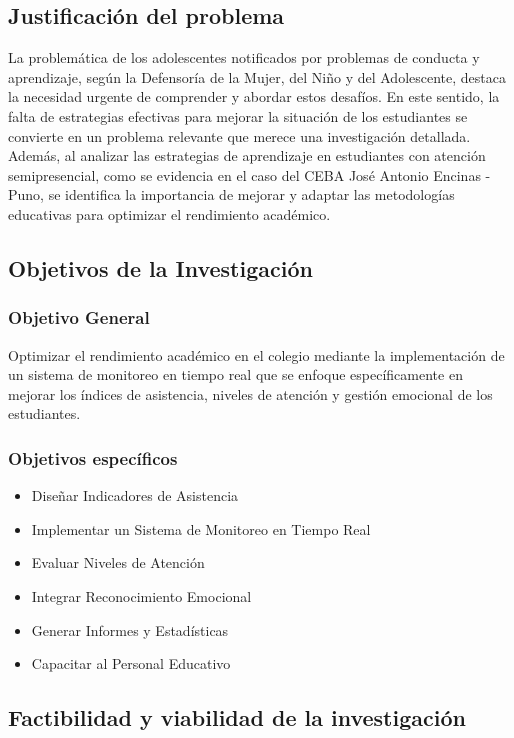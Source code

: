 \documentclass[12pt]{article}
\begin{document}
\subsection{Justificación del problema}
La problemática de los adolescentes notificados por problemas de conducta y aprendizaje, según la Defensoría de la Mujer, del Niño y del Adolescente, destaca la necesidad urgente de comprender y abordar estos desafíos. En este sentido, la falta de estrategias efectivas para mejorar la situación de los estudiantes se convierte en un problema relevante que merece una investigación detallada.
 \espacio
Además, al analizar las estrategias de aprendizaje en estudiantes con atención semipresencial, como se evidencia en el caso del CEBA José Antonio Encinas - Puno, se identifica la importancia de mejorar y adaptar las metodologías educativas para optimizar el rendimiento académico.
\cite{justificacion}
\subsection{Objetivos de la Investigación}
\subsubsection{Objetivo General}
Optimizar el rendimiento académico en el colegio mediante la implementación de un sistema de monitoreo en tiempo real que se enfoque específicamente en mejorar los índices de asistencia, niveles de atención y gestión emocional de los estudiantes.
\subsubsection{Objetivos específicos}
\begin{itemize}
    \item Diseñar Indicadores de Asistencia
    \item Implementar un Sistema de Monitoreo en Tiempo Real
    \item Evaluar Niveles de Atención
    \item Integrar Reconocimiento Emocional
    \item Generar Informes y Estadísticas
    \item Capacitar al Personal Educativo
\end{itemize}

\subsection{Factibilidad y viabilidad de la investigación }
\end{document}
